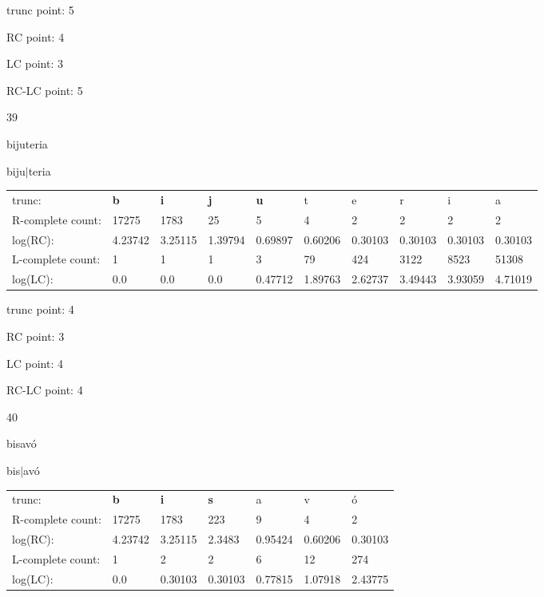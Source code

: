 \documentclass{article}
\begin{document}
trunc point: 5

RC point: 4

LC point: 3

RC-LC point: 5

\vspace{3em}



39

bijuteria

biju$|$teria

\vspace{1em}

\begin{tabular}{l|lllllllll}

trunc: & {\color{red}\bf b} & {\color{red}\bf i} & {\color{red}\bf j} & {\color{red}\bf u} & t & e & r & i & a \\ 
R-complete count: & 17275 & 1783 & 25 & 5 & 4 & 2 & 2 & 2 & 2 \\ 
log(RC): & 4.23742 & 3.25115 & 1.39794 & 0.69897 & 0.60206 & 0.30103 & 0.30103 & 0.30103 & 0.30103 \\ 
L-complete count: & 1 & 1 & 1 & 3 & 79 & 424 & 3122 & 8523 & 51308 \\ 
log(LC): & 0.0 & 0.0 & 0.0 & 0.47712 & 1.89763 & 2.62737 & 3.49443 & 3.93059 & 4.71019 \\ 
\end{tabular}

trunc point: 4

RC point: 3

LC point: 4

RC-LC point: 4

\vspace{3em}



40

bisavó

bis$|$avó

\vspace{1em}

\begin{tabular}{l|llllll}

trunc: & {\color{red}\bf b} & {\color{red}\bf i} & {\color{red}\bf s} & a & v & ó \\ 
R-complete count: & 17275 & 1783 & 223 & 9 & 4 & 2 \\ 
log(RC): & 4.23742 & 3.25115 & 2.3483 & 0.95424 & 0.60206 & 0.30103 \\ 
L-complete count: & 1 & 2 & 2 & 6 & 12 & 274 \\ 
log(LC): & 0.0 & 0.30103 & 0.30103 & 0.77815 & 1.07918 & 2.43775 \\ 
\end{tabular}
\end{document}
